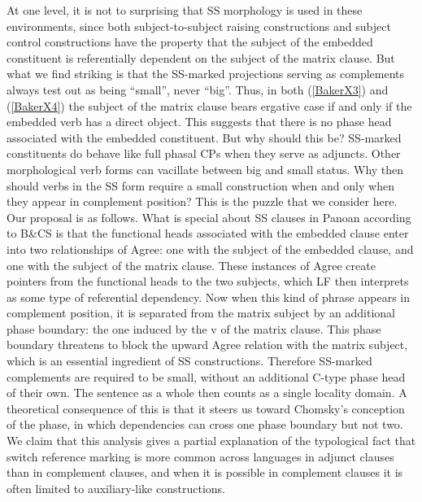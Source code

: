 \documentclass[output=paper,colorlinks,citecolor=brown,
]{langscibook}
\begin{document}
At one level, it is not to surprising that SS morphology is used in these environments, since both subject-to-subject raising constructions and subject control constructions have the property that the subject of the embedded constituent is referentially dependent on the subject of the matrix clause. But what we find striking is that the SS-marked projections serving as complements always test out as being “small”, never “big”. Thus, in both (\ref{BakerX3}) and (\ref{BakerX4}) the subject of the matrix clause bears ergative case if and only if the embedded verb has a direct object. This suggests that there is no phase head associated with the embedded constituent. But why should this be? SS-marked constituents do behave like full phasal CPs when they serve as adjuncts. Other morphological verb forms can vacillate between big and small status. Why then should verbs in the SS form require a small construction when and only when they appear in complement position? This is the puzzle that we consider here.\\

Our proposal is as follows. What is special about SS clauses in Panoan according to B\&CS is that the functional heads associated with the embedded clause enter into two relationships of Agree: one with the subject of the embedded clause, and one with the subject of the matrix clause. These instances of Agree create pointers from the functional heads to the two subjects, which LF then interprets as some type of referential dependency. Now when this kind of phrase appears in complement position, it is separated from the matrix subject by an additional phase boundary: the one induced by the v of the matrix clause. This phase boundary threatens to block the upward Agree relation with the matrix subject, which is an essential ingredient of SS constructions. Therefore SS-marked complements are required to be small, without an additional C-type phase head of their own. The sentence as a whole then counts as a single locality domain. A theoretical consequence of this is that it steers us toward Chomsky’s \citeyearpar{chomsky2001derivation} conception of the phase, in which dependencies can cross one phase boundary but not two. We claim that this analysis gives a partial explanation of the typological fact that switch reference marking is more common across languages in adjunct clauses than in complement clauses, and when it is possible in complement clauses it is often limited to auxiliary-like constructions.\\
\end{document}
